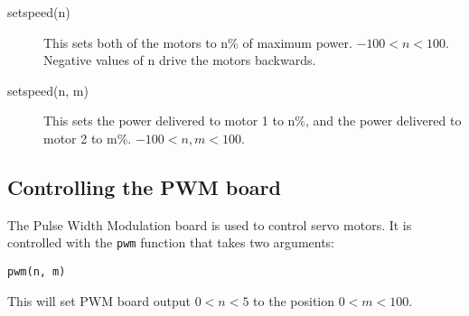 \documentclass{article}
\begin{document}
\begin{description}
\item[setspeed(n)] This sets both of the motors to n\% of maximum
power.  $-100<n<100$. Negative values of n drive the motors backwards.
\item[setspeed(n, m)] This sets the power delivered to motor 1 to n\%,
  and the power delivered to motor 2 to m\%. $-100<n,m<100$.
\end{description}

\subsection{Controlling the PWM board}
The Pulse Width Modulation board is used to control servo motors.  It is
controlled with the \texttt{pwm} function that takes two arguments:

\begin{verbatim}
pwm(n, m)
\end{verbatim}

This will set PWM board output $0<n<5$ to the position $0<m<100$.
\end{document}
